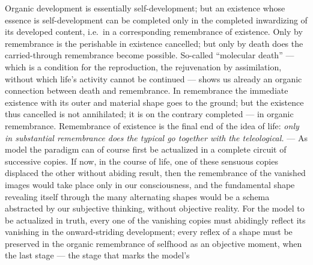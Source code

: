 \documentclass[12pt,a4paper]{book}
\begin{document}
Organic development is essentially self-development; but an existence whose
essence is self-development can be completed only in the completed
inwardizing of its developed content, i.e.\ in a corresponding remembrance of
existence. Only by remembrance is the perishable in existence cancelled; but only
by death does the carried-through remembrance become possible. So-called
``molecular death'' --- which is a condition for the reproduction, the
rejuvenation by assimilation, without which life's activity cannot be continued
--- shows us already an organic connection between death and remembrance. In
remembrance the immediate existence with its outer and material shape goes to the
ground; but the existence thus cancelled is not annihilated; it is on the contrary
completed --- in organic remembrance. Remembrance of existence is the final end of
the idea of life: \emph{only in substantial remembrance does the typical go
together with the teleological.} --- As model the paradigm can of course first be
actualized in a complete circuit of successive copies. If now, in the course of
life, one of these sensuous copies displaced the other without abiding result,
then the remembrance of the vanished images would take place only in our
consciousness, and the fundamental shape revealing itself through the many
alternating shapes would be a schema abstracted by our subjective thinking,
without objective reality. For the model to be actualized in truth, every one of
the vanishing copies must abidingly reflect its vanishing in the onward-striding
development; every reflex of a shape must be preserved in the organic remembrance
of selfhood as an objective moment, when the last stage --- the stage that marks
the model's
\end{document}
